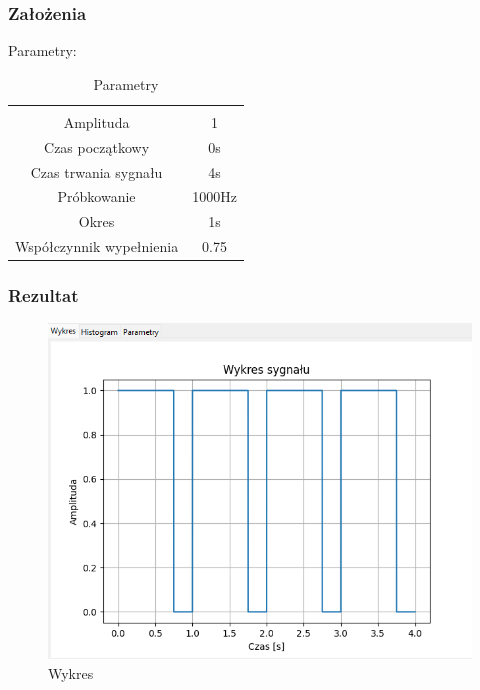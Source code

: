 \documentclass{article}
\begin{document}
\subsubsection{Założenia}
\noindent
Parametry:
\begin{table}[h!]
    \centering
    \vspace{0.2cm}
    \begin{tabular}{|c|c|}
        \hline\hline\\[-0.4cm]
        Amplituda & 1  \\
        \hline
        Czas początkowy & 0s  \\
        \hline
        Czas trwania sygnału & 4s  \\
        \hline
        Próbkowanie & 1000Hz \\
        \hline
        Okres & 1s\\
        \hline
        Współczynnik wypełnienia & 0.75\\
        \hline
    \end{tabular}
    \caption{Parametry}
    \label{prostokat}
\end{table}
\subsubsection{Rezultat}
\begin{figure}[h!]
    \centering
    \includegraphics[width=\textwidth]{img/prostokat/wykres.png}
    \caption{Wykres}
\end{figure}
\end{document}
